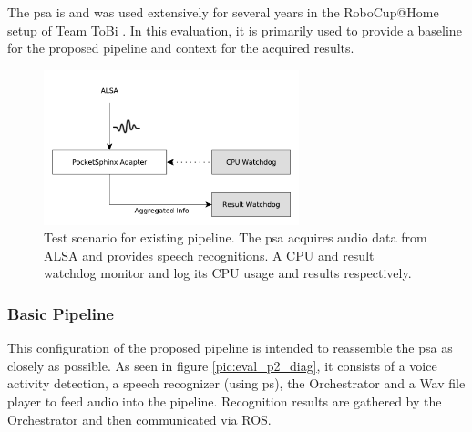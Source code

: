 The \gls{psa} is and was used extensively for several years in the RoboCup@Home setup of Team ToBi \cite{ToBi}.
In this evaluation, it is primarily used to provide a baseline for the proposed pipeline and context for the acquired results.

\begin{figure}[]
	\centering
	\includegraphics[width=0.66\textwidth]{diagrams/eval_pipeline_1.pdf}
	\caption{Test scenario for existing pipeline.
		The \gls{psa} acquires audio data from ALSA and provides speech recognitions.
		A CPU and result watchdog monitor and log its CPU usage and results respectively.}
	\label{pic:eval_p1_diag}
\end{figure}

\subsubsection{Basic Pipeline}
\label{eval:dataset:pipeline:baseline}
This configuration of the proposed pipeline is intended to reassemble the \gls{psa} as closely as possible.
As seen in figure \ref{pic:eval_p2_diag}, it consists of a voice activity detection, a speech recognizer (using \gls{ps}), the Orchestrator and a Wav file player to feed audio into the pipeline.
Recognition results are gathered by the Orchestrator and then communicated via ROS.

